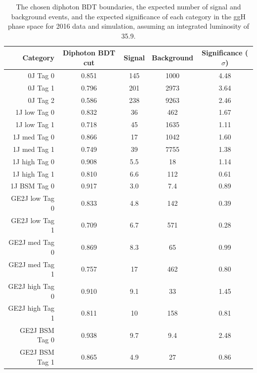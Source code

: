 \begin{table}
  \begin{centering}
    \begin{tabular}{ r | c | c | c | c } 
    \hline 
    Category         & Diphoton BDT cut & Signal & Background & Significance ($\sigma$) \\
    \hline 
    0J Tag 0         & 0.851            & 145    & 1000       & 4.48                    \\
    0J Tag 1         & 0.796            & 201    & 2973       & 3.64                    \\
    0J Tag 2         & 0.586            & 238    & 9263       & 2.46                    \\
    \hline           
    1J low  Tag 0    & 0.832            & 36     & 462        & 1.67                    \\
    1J low  Tag 1    & 0.718            & 45     & 1635       & 1.11                    \\
    1J med  Tag 0    & 0.866            & 17     & 1042       & 1.60                    \\
    1J med  Tag 1    & 0.749            & 39     & 7755       & 1.38                    \\
    1J high Tag 0    & 0.908            & 5.5    & 18         & 1.14                    \\
    1J high Tag 1    & 0.810            & 6.6    & 112        & 0.61                    \\
    1J BSM  Tag 0    & 0.917            & 3.0    & 7.4        & 0.89                    \\
    \hline           
    GE2J low  Tag 0  & 0.833            & 4.8    & 142        & 0.39                    \\
    GE2J low  Tag 1  & 0.709            & 6.7    & 571        & 0.28                    \\
    GE2J med  Tag 0  & 0.869            & 8.3    & 65         & 0.99                    \\
    GE2J med  Tag 1  & 0.757            & 17     & 462        & 0.80                    \\
    GE2J high Tag 0  & 0.910            & 9.1    & 33         & 1.45                    \\
    GE2J high Tag 1  & 0.811            & 10     & 158        & 0.81                    \\
    GE2J BSM  Tag 0  & 0.938            & 9.7    & 9.4        & 2.48                    \\
    GE2J BSM  Tag 1  & 0.865            & 4.9    & 27         & 0.86                    \\
    \hline 
    \end{tabular}
    \caption{The chosen diphoton BDT boundaries, 
    the expected number of signal and background events, 
    and the expected significance of each category in the ggH phase space 
    for 2016 data and simulation, assuming an integrated luminosity of \SI{35.9}{\fbinv}.}
    \label{tab:cat_ggHsignificance2016}
  \end{centering}
\end{table}

